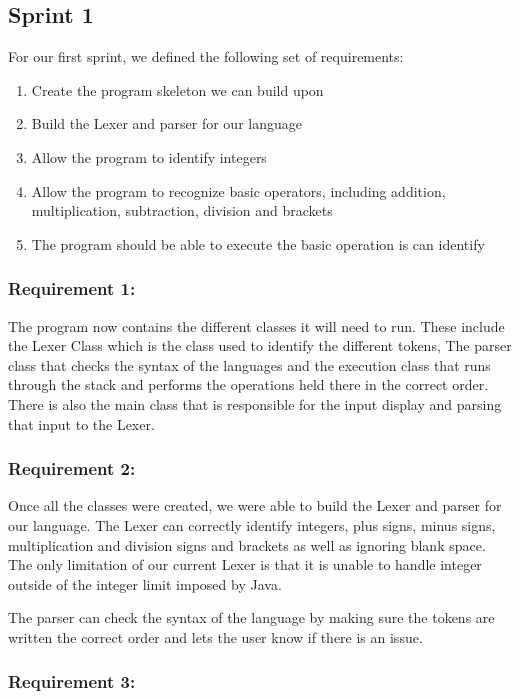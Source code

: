 \documentclass[a4paper, oneside, 11pt]{report}
\begin{document}
\subsection{Sprint 1}

For our first sprint, we defined the following set of requirements: 

\begin{enumerate}
\item Create the program skeleton we can build upon 
\item Build the Lexer and parser for our language 
\item Allow the program to identify integers 
\item Allow the program to recognize basic operators, including addition, multiplication, subtraction, division and brackets 
\item The program should be able to execute the basic operation is can identify 
\end{enumerate}

\subsubsection{Requirement 1: }

The program now contains the different classes it will need to run. These include the Lexer Class which is the class used to identify the different tokens, The parser class that checks the syntax of the languages and the execution class that runs through the stack and performs the operations held there in the correct order. There is also the main class that is responsible for the input display and parsing that input to the Lexer. 

\subsubsection{Requirement 2: }

Once all the classes were created, we were able to build the Lexer and parser for our language. The Lexer can correctly identify integers, plus signs, minus signs, multiplication and division signs and brackets as well as ignoring blank space. The only limitation of our current Lexer is that it is unable to handle integer outside of the integer limit imposed by Java. 

The parser can check the syntax of the language by making sure the tokens are written the correct order and lets the user know if there is an issue. 

\subsubsection{Requirement 3: }
\end{document}
